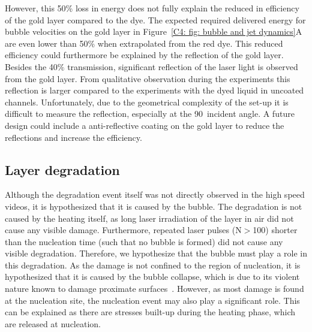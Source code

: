 \documentclass[11pt]{article}
\begin{document}
However, this 50\% loss in energy does not fully explain the reduced in efficiency of the gold layer compared to the dye. The expected required delivered energy for bubble velocities on the gold layer in Figure~\ref{C4: fig: bubble and jet dynamics}A are even lower than 50\% when extrapolated from the red dye. This reduced efficiency could furthermore be explained by the reflection of the gold layer. Besides the 40$\%$ transmission, significant reflection of the laser light is observed from the gold layer. From qualitative observation during the experiments this reflection is larger compared to the experiments with the dyed liquid in uncoated channels. Unfortunately, due to the geometrical complexity of the set-up it is difficult to measure the reflection, especially at the 90\textdegree~incident angle. A future design could include a anti-reflective coating on the gold layer to reduce the reflections and increase the efficiency.







\subsection{Layer degradation}
Although the degradation event itself was not directly observed in the high speed videos, it is hypothesized that it is caused by the bubble. The degradation is not caused by the heating itself, as long laser irradiation of the layer in air did not cause any visible damage. Furthermore, repeated laser pulses (N$>$100) shorter than the nucleation time (such that no bubble is formed) did not cause any visible degradation. Therefore, we hypothesize that the bubble must play a role in this degradation. As the damage is not confined to the region of nucleation, it is hypothesized that it is caused by the bubble collapse, which is due to its violent nature known to damage proximate surfaces~\cite{Reuter2022,Rossello2022a}. However, as most damage is found at the nucleation site, the nucleation event may also play a significant role. This can be explained as there are stresses built-up during the heating phase, which are released at nucleation.
\end{document}
